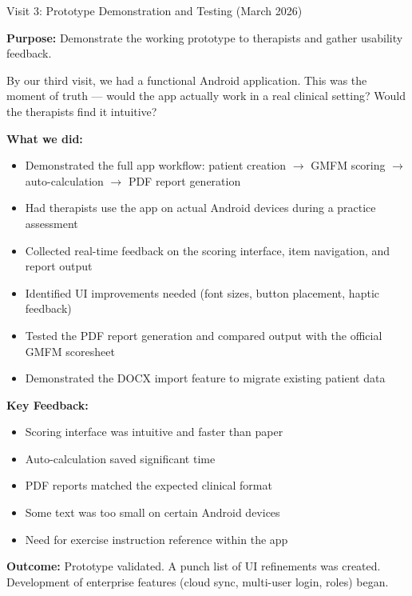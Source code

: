 \documentclass[11pt,a4paper]{article}
\begin{document}
\vspace{0.5cm}

\begin{visitbox}[visitpurple]{Visit 3: Prototype Demonstration and Testing (March 2026)}

\textbf{Purpose:} Demonstrate the working prototype to therapists and gather usability feedback.

By our third visit, we had a functional Android application. This was the moment of truth --- would the app actually work in a real clinical setting? Would the therapists find it intuitive?

\textbf{What we did:}
\begin{itemize}[leftmargin=1.5em, itemsep=2pt]
    \item Demonstrated the full app workflow: patient creation $\rightarrow$ GMFM scoring $\rightarrow$ auto-calculation $\rightarrow$ PDF report generation
    \item Had therapists use the app on actual Android devices during a practice assessment
    \item Collected real-time feedback on the scoring interface, item navigation, and report output
    \item Identified UI improvements needed (font sizes, button placement, haptic feedback)
    \item Tested the PDF report generation and compared output with the official GMFM scoresheet
    \item Demonstrated the DOCX import feature to migrate existing patient data
\end{itemize}

\textbf{Key Feedback:}
\begin{itemize}[leftmargin=1.5em, itemsep=2pt]
    \item[$\checkmark$] Scoring interface was intuitive and faster than paper
    \item[$\checkmark$] Auto-calculation saved significant time
    \item[$\checkmark$] PDF reports matched the expected clinical format
    \item[$\triangle$] Some text was too small on certain Android devices
    \item[$\triangle$] Need for exercise instruction reference within the app
\end{itemize}

\textbf{Outcome:} Prototype validated. A punch list of UI refinements was created. Development of enterprise features (cloud sync, multi-user login, roles) began.


\end{visitbox}
\end{document}
